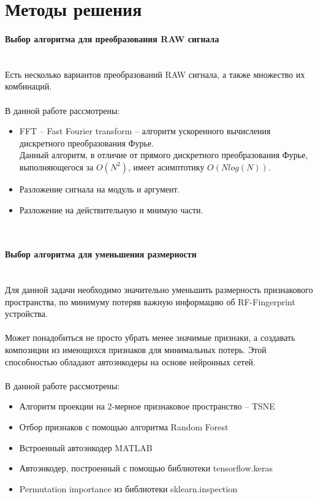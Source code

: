     \newpage    
    \section{Методы решения}
    
        \paragraph{Выбор алгоритма для преобразования RAW сигнала} 
            \noindent \\
            
            \noindent
            Есть несколько вариантов преобразований RAW сигнала, а также множество их комбинаций. \\ \\
            В данной работе рассмотрены:
            \begin{itemize}
                \item FFT -- Fast Fourier transform -- алгоритм ускоренного вычисления дискретного преобразования Фурье.\\
                Данный алгоритм, в отличие от прямого дискретного преобразования Фурье, выполняющегося за $O(N^2)$, имеет асимптотику $O(N log(N))$.
                \item Разложение сигнала на модуль и аргумент.
                \item Разложение на действительную и мнимую части. \\
            \end{itemize} \\
        \paragraph{Выбор алгоритма для уменьшения размерности}
        \noindent \\
    
            \noindent 
            Для данной задачи необходимо значительно уменьшить размерность признакового пространства, по минимуму потеряв важную информацию об RF-Fingerprint устройства.\\ \\ 
            Может понадобиться не просто убрать менее значимые признаки, а создавать композиции из имеющихся признаков для минимальных потерь. Этой способностью обладают автоэнкодеры на основе нейронных сетей. \\ \\
            В данной работе рассмотрены:
            \begin{itemize}
                \item Алгоритм проекции на 2-мерное признаковое пространство -- TSNE
                \item Отбор признаков с помощью алгоритма Random Forest
                \item Встроенный автоэнкодер MATLAB
                \item Автоэнкодер, построенный с помощью библиотеки tensorflow.keras
                \item Permutation importance из библиотеки sklearn.inspection \\
            \end{itemize}
            
